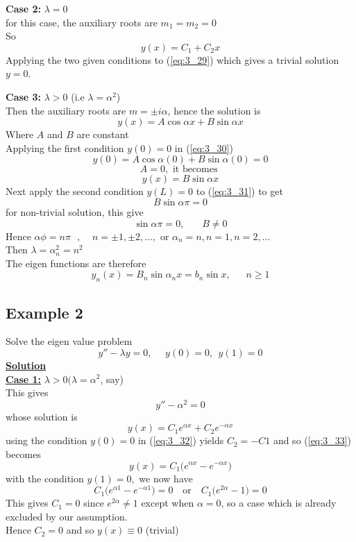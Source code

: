 \documentclass[12pt]{report}
\newcommand{\bt}[1]{\textbf{#1}}
\newcommand{\ubt}[1]{\textbf{\underline{#1}}}
\newcommand{\sps}{\\[0.2cm]}
\newcommand{\refn}[1]{(\ref{#1})}
\newcommand{\refx}[1]{\refn{eq:#1}}
\newcommand{\NI}{\noindent}
\newcommand{\dprime}{''}
\begin{document}
	\NI\bt{Case 2:} $\lambda = 0 $\sps
	for this case, the auxiliary roots are $m_1=m_2=0$\sps
	So
	\begin{equation}
		y(x) = C_1 + C_2 x \label{eq:3_29}
	\end{equation}
	Applying the two given conditions to \refx{3_29} which gives a trivial solution $y=0$. 
	
	\NI\bt{Case 3:} $\lambda > 0$ (i.e $\lambda = \alpha^2$)\sps
	Then the auxiliary roots are $m = \pm i\alpha$, hence the solution is 
	\begin{equation}
		y(x) = A\cos \alpha x + B \sin \alpha x \label{eq:3_30}
	\end{equation}
	Where $A$ and $B$ are constant\sps
	Applying the first condition $y(0)=0$ in \refx{3_30}
	$$
		y(0) = A\cos\alpha(0) + B\sin\alpha(0) = 0
	$$
	$$
		A=0, \text{ it becomes }
	$$
	\begin{equation}
		y(x) = B\sin\alpha x \label{eq:3_31}
	\end{equation}
	Next apply the second condition $y(L) = 0$ to \refx{3_31} to get 
	$$
		B\sin\alpha\pi = 0
	$$
	for non-trivial solution, this give
	$$
		\sin\alpha\pi = 0, ~~~~~~~~ B \neq 0 
	$$
	Hence $\alpha\phi = n\pi ~~~ , ~~~~~ n=\pm 1, \pm 2, \ldots, \text{ or } \alpha_n = n, n=1, n=2, \ldots$\sps
	Then $\lambda = \alpha_n^2 = n^2$\sps
	The eigen functions are therefore
	$$
		y_n(x) = B_n\sin \alpha_n x = b_n\sin x , ~~~~~~~ n \geq 1
	$$
	\newpage
	
	\subsection*{Example 2}
	Solve the eigen value problem
	\begin{equation}
		y\dprime - \lambda y = 0, ~~~~~~ y(0) = 0, ~~ y(1) = 0 \label{eq:3_32}
	\end{equation}
	\ubt{Solution}\sps
	
	\NI\ubt{Case 1:} $\lambda > 0 (\lambda = \alpha^2$, say)\sps
	This gives
	$$
		y\dprime - \alpha^2 = 0
	$$
	whose solution is 
	\begin{equation}
		y(x) = C_1 e^{\alpha x} + C_2 e^{-\alpha x} \label{eq:3_33}
	\end{equation}
	using the condition $y(0) = 0$ in \refx{3_32} yields $C_2 = -C1$ and so \refx{3_33} becomes
	\begin{equation}
		y(x) = C_1\Big(e^{\alpha x} - e^{-\alpha x}\Big) \label{eq:3_34}
	\end{equation}
	with the condition $y(1) = 0,$ we now have
	$$
		C_1\Big(e^{\alpha 1} - e^{-\alpha 1}\Big) = 0 ~~~\text{ or }~~~ C_1\Big(e^{2\alpha} - 1\Big) = 0 
	$$
	This gives $C_1 = 0$ since $e^{2\alpha} \neq 1$ except when $\alpha = 0$, so a case which is already excluded by our assumption.\sps
	Hence $C_2 = 0$ and so $y(x) \equiv 0$ (trivial)\sps
	
\end{document}

